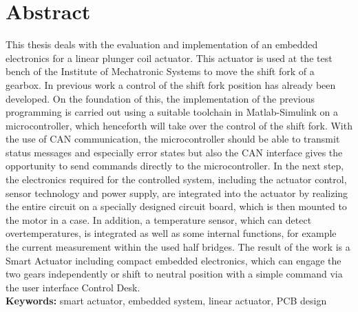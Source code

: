 \documentclass[nochapterpage,bigchapter,linedtoc,longdoc,colorback,accentcolor=tud1c]{tudreport}
\begin{document}
\section*{Abstract}
This thesis deals with the evaluation and implementation of an embedded electronics for a linear plunger coil actuator.  This actuator is used at the test bench of the Institute of Mechatronic Systems to move the shift fork of a gearbox.
In previous work a control of the shift fork position has already been developed. On the foundation of this, the implementation of the previous programming is carried out using a suitable toolchain in Matlab-Simulink on a microcontroller, which henceforth will take over the control of the shift fork. With the use of CAN communication, the microcontroller should be able to transmit status messages and especially error states but also the CAN interface gives the opportunity to send commands directly to the microcontroller. In the next step, the electronics required for the controlled system, including the actuator control, sensor technology and power supply, are integrated into the actuator by realizing the entire circuit on a specially designed circuit board, which is then mounted to the motor in a case. In addition, a temperature sensor, which can detect overtemperatures, is integrated as well as some internal functions, for example the current measurement within the used half bridges.  The result of the work is a Smart Actuator including compact embedded electronics, which can engage the two gears independently or shift to neutral position with a simple command via the user interface Control Desk.\\

\textbf{Keywords:} smart actuator, embedded system, linear actuator, PCB design\newpage
\listoffigures{}
\tableofcontents{}

\newpage
{}









\printbibliography
\end{document}
